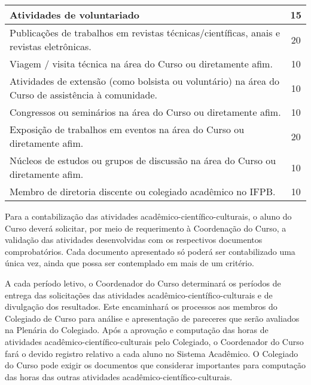 \begin{table}[h]
\begin{tabular}{|l|c|}
Atividades de voluntariado                                                                        & 15                                                                                         \\ \hline
Publicações de trabalhos em revistas técnicas/científicas, anais e revistas eletrônicas.          & 20                                                                                         \\ \hline
Viagem / visita técnica na área do Curso ou diretamente afim.                                     & 10                                                                                         \\ \hline
Atividades de extensão (como bolsista ou voluntário) na área do Curso de assistência à comunidade.                              & 10                                                                                         \\ \hline
Congressos ou seminários na área do Curso ou diretamente afim.                                    & 10                                                                                         \\ \hline
Exposição de trabalhos em eventos na área do Curso ou diretamente afim.                           & 20                                                                                         \\ \hline
Núcleos de estudos ou grupos de discussão na área do Curso ou diretamente afim.                   & 10                                                                                         \\ \hline
Membro de diretoria discente ou colegiado acadêmico no IFPB.                                      & 10                                                                                         \\ \hline
\end{tabular}
\end{table}

Para a contabilização das atividades acadêmico-científico-culturais, o aluno do Curso deverá solicitar, por meio de requerimento à Coordenação do Curso, a validação das atividades desenvolvidas com os respectivos documentos comprobatórios. Cada documento apresentado só poderá ser contabilizado uma única vez, ainda que possa ser contemplado em mais de um critério.

A cada período letivo, o Coordenador do Curso determinará os períodos de entrega das solicitações das atividades acadêmico-científico-culturais e de divulgação dos resultados. Este encaminhará os processos aos membros do Colegiado de Curso para análise e apresentação de pareceres que serão avaliados na Plenária do Colegiado. Após a aprovação e computação das horas de atividades acadêmico-científico-culturais pelo Colegiado, o Coordenador do Curso fará o devido registro relativo a cada aluno no Sistema Acadêmico. O Colegiado do Curso pode exigir os documentos que considerar importantes para computação das horas das outras atividades acadêmico-científico-culturais.

